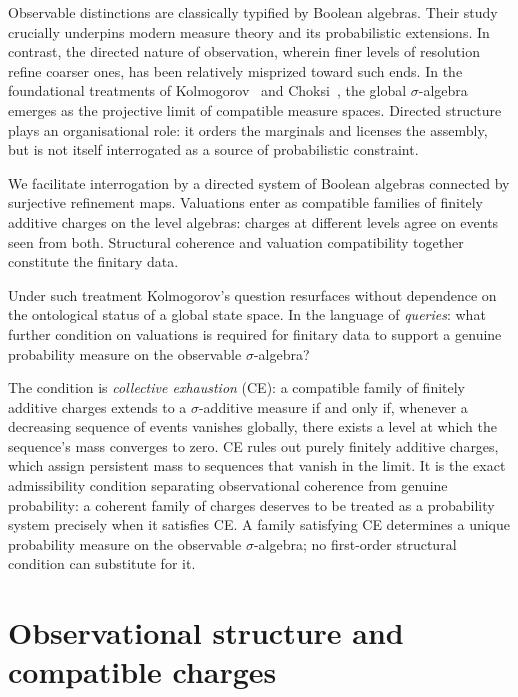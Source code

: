Observable distinctions are classically typified by Boolean algebras. Their study crucially underpins modern measure theory and its probabilistic extensions. In contrast, the directed nature of observation, wherein finer levels of resolution refine coarser ones, has been relatively misprized toward such ends.  In the foundational treatments of Kolmogorov~\cite{Kolmogorov} and Choksi~\cite{choksi1958}, the global $\sigma$-algebra emerges as the projective limit of compatible measure spaces. Directed structure plays an organisational role: it orders the marginals and licenses the assembly, but is not itself interrogated as a source of probabilistic constraint.

We facilitate interrogation by a directed system of Boolean algebras connected by surjective refinement maps. Valuations enter as compatible families of finitely additive charges on the level algebras: charges at different levels agree on events seen from both. Structural coherence and valuation compatibility together constitute the finitary data.  

Under such treatment Kolmogorov's question resurfaces without dependence on the ontological status of a global state space. In the language of \emph{queries}: what further condition on valuations is required for finitary data to support a genuine probability measure on the observable $\sigma$-algebra?

The condition is \emph{collective exhaustion} (CE): a compatible family of finitely additive charges extends to a $\sigma$-additive measure if and only if, whenever a decreasing sequence of events vanishes globally, there exists a level at which the sequence's mass converges to zero.  CE rules out purely finitely additive charges, which assign persistent mass to sequences that vanish in the limit.  It is the exact admissibility condition separating observational coherence from genuine probability: a coherent family of charges deserves to be treated as a probability system precisely when it satisfies CE.  A family satisfying CE determines a unique probability measure on the observable $\sigma$-algebra; no first-order structural condition can substitute for it.


\section{Observational structure and compatible charges}
\label{sec:setup}

